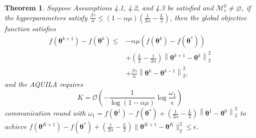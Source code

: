 \documentclass[lettersize,journal]{IEEEtran}
\newtheorem{theorem}{Theorem}
\begin{document}
\begin{theorem}
\label{theorem2}
Suppose Assumptions 4.1, 4.2, and 4.3 be satisfied and $\mathcal{M}_c^k \neq \varnothing$, if the hyperparameters satisfy $\frac{\beta\gamma}{\alpha} \leqslant (1-\alpha\mu)\left(\frac{1}{2\alpha} - \frac{L}{2}\right)$, then the global objective function satisfies
\begin{equation}
\begin{aligned}
f(\boldsymbol{\theta}^{k+1})-f(\boldsymbol{\theta}^k) 
{\leqslant}& -\alpha\mu (f(\boldsymbol{\theta}^k)  - f(\boldsymbol{\theta}^*)) \\
&+ \left( \frac{L}{2} - \frac{1}{2\alpha} \right) \left\|\boldsymbol{\theta}^{k+1} -\boldsymbol{\theta}^{k}\right\|_2^2\\
&+ \frac{\beta\gamma}{\alpha} \left\|\boldsymbol{\theta}^{k} - \boldsymbol{\theta}^{k-1}\right\|_2^2,
\end{aligned}
\label{18}
\end{equation}
and the AQUILA requires 
\begin{equation}
    K = \mathcal{O}\left(- \frac{1}{\log (1 - \alpha \mu)}  \log \frac{\omega_1}{\epsilon}\right)
\end{equation} 
communication round with $\omega_1 = f(\boldsymbol{\theta}^1)-f(\boldsymbol{\theta}^{*})+\left(\frac{1}{2\alpha} - \frac{L}{2}\right) \left\|\boldsymbol{\theta}^{1} - \boldsymbol{\theta}^{0}\right\|_2^2$ to achieve $f(\boldsymbol{\theta}^{K+1})-f(\boldsymbol{\theta}^*)+ (\frac{1}{2\alpha} - \frac{L}{2}) \|\boldsymbol{\theta}^{K+1} - \boldsymbol{\theta}^{K}\|_2^2 \leqslant \epsilon$.
\end{theorem}
\end{document}

